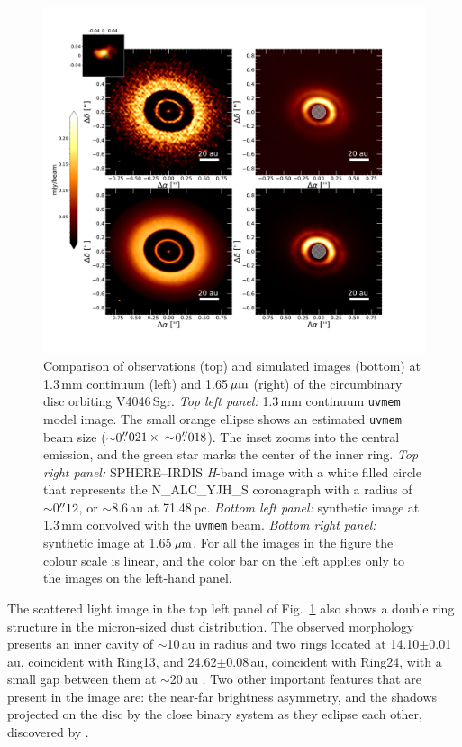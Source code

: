 \documentclass[fleqn,usenatbib,useAMS]{mnras}
\newcommand{\red}[1]{\textcolor{red}{#1}}
\begin{document}
\begin{figure}
  \includegraphics[width=\textwidth]{hot_two_E.pdf}
  \caption{Comparison of observations (top) and simulated images (bottom) at 1.3\,mm continuum (left) and 1.65\,$\hbox{$\mu$m}$ (right) of the circumbinary disc orbiting V4046\,Sgr. \textit{Top left panel:} 1.3\,mm continuum {\tt uvmem} model image. The small orange ellipse shows an estimated {\tt uvmem} beam size ($\sim$0$\hbox{$.\!\!^{\prime\prime}$}021 \, \times \, \sim$0$\hbox{$.\!\!^{\prime\prime}$}018$). The inset zooms into the central emission, and the green star marks the center of the inner ring. \textit{Top right panel:} SPHERE--IRDIS \textit{H}-band image with a white filled circle that represents the N\_ALC\_YJH\_S coronagraph with a radius of $\sim$0$\hbox{$.\!\!^{\prime\prime}$}12$, or $\sim$8.6\,au at 71.48\,pc.  \textit{Bottom left panel:} synthetic image at 1.3\,mm convolved with the {\tt uvmem} beam. \textit{Bottom right panel:} synthetic image at 1.65\,$\hbox{$\mu$m}$. For all the images in the figure the colour scale is linear, and the color bar on the left applies only to the images on the left-hand panel.}
  \label{fig:images_vs_simulated}
\end{figure}

The scattered light image in the top left panel of Fig.~\ref{fig:images_vs_simulated} also shows a double ring structure in the micron-sized dust distribution. The observed morphology presents an inner cavity of $\sim$10\,au in radius and two rings located at 14.10$\pm$0.01\,au, coincident with Ring13, and 24.62$\pm$0.08\,au, coincident with Ring24, with a small gap between them at $\sim$20\,au \red{\citep{Ru_z_Rodr_guez_2019}}. Two other important features that are present in the image are: the near-far brightness asymmetry, and the shadows projected on the disc by the close binary system as they eclipse each other, discovered by \citet{dOrazi}.
\end{document}
